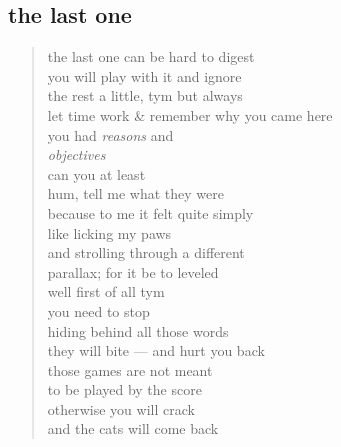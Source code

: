 \documentclass[11pt]{article}
\begin{document}
\subsection{the last one}
\label{sec:org49f2c5d}
\begin{verse}
the last one can be hard to digest\\
you will play with it  and ignore\\
the rest a little, tym but always\\
let time work \& remember why you came here\\
you had \textit{reasons} and\\
\textit{objectives}\\
\vspace*{1em}
can you at least\\
hum, tell me what they were\\
because to me it felt quite simply\\
like licking my paws\\
and strolling through a different\\
parallax; for it be to leveled\\
\vspace*{1em}
well first of all tym\\
you need to stop\\
hiding behind all those words\\
they will bite --- and hurt you back\\
those games are not meant\\
to be played by the score\\
otherwise you will crack\\
and the cats will come back\\
\end{verse}
\end{document}
